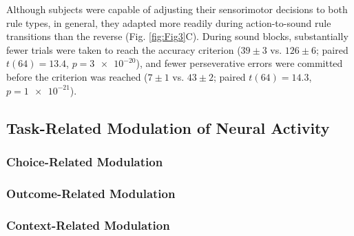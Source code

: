 Although subjects were capable of adjusting their sensorimotor decisions to both rule types, in general, they adapted more readily during action-to-sound rule transitions than the reverse (Fig. \ref{fig:Fig3}C). During sound blocks, substantially fewer trials were taken to reach the accuracy criterion ($39 \pm 3$ vs. $126 \pm 6$; paired $t(64) =13.4$, $p=\num{3e-20}$), and fewer perseverative errors were committed before the criterion was reached ($7 \pm 1$ vs. $43 \pm 2$; paired $t(64) =14.3$, $p=\num{1e-21}$).

\subsection*{Task-Related Modulation of Neural Activity}


\subsubsection*{Choice-Related Modulation}

\subsubsection*{Outcome-Related Modulation}

\subsubsection*{Context-Related Modulation}